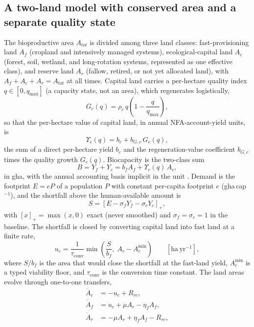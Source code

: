 \documentclass[preprint,12pt,authoryear]{elsarticle}
\newcommand{\pos}[1]{\left[#1\right]_+}
\newcommand{\Ups}{\Upsilon_c}
\newcommand{\Acmin}{A_c^{\min}}
\newcommand{\tconv}{\tau_{\mathrm{conv}}}
\begin{document}
\subsection{A two-land model with conserved area and a separate quality state}\label{sec:equations}

The bioproductive area $A_{tot}$ is divided among three land classes: fast-provisioning land $A_f$ (cropland and intensively managed systems), ecological-capital land $A_c$ (forest, soil, wetland, and long-rotation systems, represented as one effective class), and reserve land $A_r$ (fallow, retired, or not yet allocated land), with $A_f+A_c+A_r=A_{tot}$ at all times. Capital land carries a per-hectare quality index $q\in[0,q_{\max}]$ (a capacity state, not an area), which regenerates logistically,
\begin{equation}\label{eq:Gc}
G_c(q)=\rho_c\,q\left(1-\frac{q}{q_{\max}}\right),
\end{equation}
so that the per-hectare value of capital land, in annual NFA-account-yield units, is
\begin{equation}\label{eq:Ups}
\Ups(q)=b_c+b_{G,c}\,G_c(q),
\end{equation}
the sum of a direct per-hectare yield $b_c$ and the regeneration-value coefficient $b_{G,c}$ times the quality growth $G_c(q)$. Biocapacity is the two-class sum
\begin{equation}\label{eq:B}
B=Y_f+Y_c=b_f A_f+\Ups(q)\,A_c ,
\end{equation}
in gha, with the annual accounting basis implicit in the unit \citep{GFNStandards2009,GFNGuidebook2019}. Demand is the footprint $E=eP$ of a population $P$ with constant per-capita footprint $e$ (gha\,cap$^{-1}$), and the shortfall above the human-available amount is
\begin{equation}\label{eq:S}
S=\pos{E-\sigma_f Y_f-\sigma_c Y_c},
\end{equation}
with $\pos{x}=\max(x,0)$ exact (never smoothed) and $\sigma_f=\sigma_c=1$ in the baseline. The shortfall is closed by converting capital land into fast land at a finite rate,
\begin{equation}\label{eq:uc}
u_c=\frac{1}{\tconv}\min\!\left(\frac{S}{b_f},\;A_c-\Acmin\right)\qquad[\mathrm{ha\,yr^{-1}}],
\end{equation}
where $S/b_f$ is the area that would close the shortfall at the fast-land yield, $\Acmin$ is a typed viability floor, and $\tconv$ is the conversion time constant. The land areas evolve through one-to-one transfers,
\begin{align}
\dot A_c&=-u_c+R_{rc},\label{eq:Ac}\\
\dot A_f&=u_c+\mu A_r-\eta_f A_f,\label{eq:Af}\\
\dot A_r&=-\mu A_r+\eta_f A_f-R_{rc},\label{eq:Ar}
\end{align}
\end{document}
